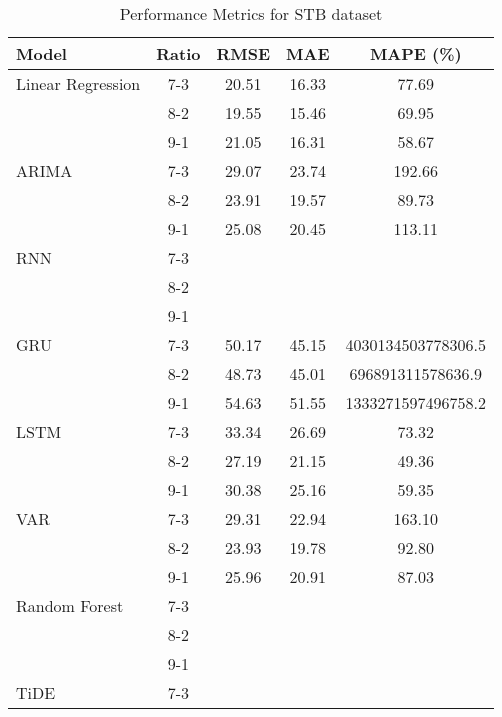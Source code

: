 \begin{table}[h!]
    \centering
    \caption{Performance Metrics for STB dataset}
    \begin{tabular}{|l|c|c|c|c|}
    \hline
    \rowcolor{orange!30} \textbf{Model} & \textbf{Ratio} & \textbf{RMSE} & \textbf{MAE} & \textbf{MAPE (\%)} \\ \hline
    \rowcolor{white} Linear Regression & 7-3 & 20.51 & 16.33 & 77.69 \\ \hline
    \rowcolor{white}  & 8-2 & 19.55 & 15.46 & 69.95 \\ \hline
    \rowcolor{white}  & 9-1 & 21.05 & 16.31 & 58.67 \\ \hline
    \rowcolor{white} ARIMA & 7-3 & 29.07 & 23.74 & 192.66 \\ \hline
    \rowcolor{white}  & 8-2 & 23.91 & 19.57 & 89.73 \\ \hline
    \rowcolor{white}  & 9-1 & 25.08 & 20.45 & 113.11 \\ \hline
    \rowcolor{white} RNN & 7-3 &  &  &  \\ \hline
    \rowcolor{white}  & 8-2 &  &  &  \\ \hline
    \rowcolor{white}  & 9-1 &  &  &  \\ \hline
    \rowcolor{white} GRU & 7-3 & 50.17 & 45.15 & 4030134503778306.5 \\ \hline
    \rowcolor{white}  & 8-2 & 48.73 & 45.01 & 696891311578636.9 \\ \hline
    \rowcolor{white}  & 9-1 & 54.63 & 51.55 & 1333271597496758.2\\ \hline
    \rowcolor{white} LSTM & 7-3 & 33.34 & 26.69 & 73.32 \\ \hline
    \rowcolor{white}  & 8-2 & 27.19 & 21.15 & 49.36 \\ \hline
    \rowcolor{white}  & 9-1 & 30.38 & 25.16 & 59.35 \\ \hline
    \rowcolor{white} VAR & 7-3 & 29.31 & 22.94 & 163.10 \\ \hline
    \rowcolor{white}  & 8-2 & 23.93 & 19.78 & 92.80 \\ \hline
    \rowcolor{white}  & 9-1 & 25.96 & 20.91 & 87.03 \\ \hline
    \rowcolor{white} Random Forest & 7-3 &  &  &  \\ \hline
    \rowcolor{white}  & 8-2 &  &  &  \\ \hline
    \rowcolor{white}  & 9-1 &  &  &  \\ \hline
    \rowcolor{green!30} TiDE & 7-3 &  &  &  \\ \hline

\end{tabular}
\end{table}
